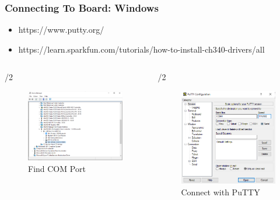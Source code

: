 \documentclass{beamer} \usetheme{Madrid}
\begin{document}
\begin{frame}
	\frametitle{Connecting To Board: Windows}
	\begin{itemize}
		\item https://www.putty.org/
		\item https://learn.sparkfun.com/tutorials/how-to-install-ch340-drivers/all
	\end{itemize}
	\begin{columns}[t]
		\begin{column}{{\textwidth}/2}
			\begin{figure}[H]
				\centering
				\includegraphics[width=2in]{device.PNG}
				\caption{Find COM Port}
			\end{figure}
		\end{column}
		\begin{column}{{\textwidth}/2}
			\begin{figure}[H]
				\centering
				\includegraphics[width=2in]{putty.PNG}
				\caption{Connect with PuTTY}
			\end{figure}
		\end{column}
	\end{columns}
\end{frame}

\end{document}
